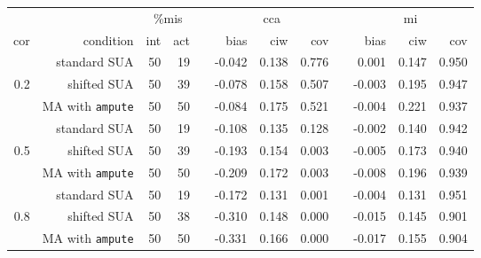 \documentclass[11pt,a4paper]{article}
\newcommand{\code}[1]{\texttt{#1}}
\begin{document}
\begin{table}[h!]
\bigskip
\begin{subtable}{1\textwidth}
\centering
\captionsetup{justification=justified,singlelinecheck=false,width = 0.93\textwidth}
  \label{sim2c}
\begin{tabular}{rrrrrrrrrrrr}
  \hline
&& \multicolumn{2}{c}{\%mis} && \multicolumn{3}{c}{cca} && \multicolumn{3}{c}{mi} \\
\cline{3-4} \cline{6-8} \cline{10-12}
cor & condition & int & act & & bias & ciw & cov & & bias & ciw & cov \\ 
\hline
 & standard SUA & 50 & 19 &  & -0.042 & 0.138 & 0.776 &  & 0.001 & 0.147 & 0.950 \\ 
  0.2 & shifted SUA & 50 & 39 &  & -0.078 & 0.158 & 0.507 &  & -0.003 & 0.195 & 0.947 \\ 
   & MA with \code{ampute} & 50 & 50 &  & -0.084 & 0.175 & 0.521 &  & -0.004 & 0.221 & 0.937 \\ 
   \cline{2-12}
   & standard SUA & 50 & 19 &  & -0.108 & 0.135 & 0.128 &  & -0.002 & 0.140 & 0.942 \\ 
  0.5 & shifted SUA & 50 & 39 &  & -0.193 & 0.154 & 0.003 &  & -0.005 & 0.173 & 0.940 \\ 
   & MA with \code{ampute} & 50 & 50 &  & -0.209 & 0.172 & 0.003 &  & -0.008 & 0.196 & 0.939 \\ 
   \cline{2-12}
   & standard SUA & 50 & 19 &  & -0.172 & 0.131 & 0.001 &  & -0.004 & 0.131 & 0.951 \\ 
  0.8 & shifted SUA & 50 & 38 &  & -0.310 & 0.148 & 0.000 &  & -0.015 & 0.145 & 0.901 \\ 
   & MA with \code{ampute} & 50 & 50 &  & -0.331 & 0.166 & 0.000 &  & -0.017 & 0.155 & 0.904 \\ 
   \hline
\end{tabular}
\vspace{2mm}
\captionsetup{justification=justified,singlelinecheck=false,width = 0.93\textwidth}
  \end{subtable}
  \vspace{-3.0\baselineskip}
  \end{table}
\end{document}
